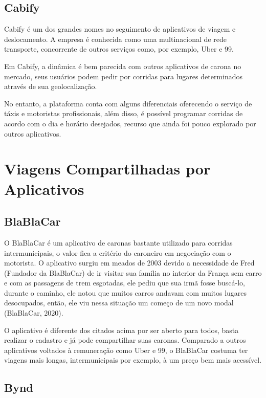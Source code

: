\subsection{Cabify}

Cabify é um dos grandes nomes no seguimento de aplicativos de viagem e deslocamento. A empresa é conhecida como uma multinacional de rede transporte, concorrente de outros serviços como, por exemplo, Uber e 99.

Em Cabify, a dinâmica é bem parecida com outros aplicativos de carona no mercado, seus usuários podem pedir por corridas para lugares determinados através de sua geolocalização.

No entanto, a plataforma conta com alguns diferenciais oferecendo o serviço de táxis e motoristas profissionais, além disso, é possível programar corridas de acordo com o dia e horário desejados, recurso que ainda foi pouco explorado por outros aplicativos. 


\section{Viagens Compartilhadas por Aplicativos}
\subsection{BlaBlaCar}

 O BlaBlaCar é um aplicativo de caronas bastante utilizado para corridas intermunicipais, o valor fica a critério do caroneiro em negociação com o motorista. O aplicativo surgiu em meados de 2003 devido a necessidade de Fred (Fundador da BlaBlaCar) de ir visitar sua família no interior da França sem carro e com as passagens de trem esgotadas, ele pediu que sua irmã fosse buscá-lo, durante o caminho, ele notou que muitos carros andavam com muitos lugares desocupados, então, ele viu nessa situação um começo de um novo modal (BlaBlaCar, 2020).
        
O aplicativo é diferente dos citados acima por ser aberto para todos, basta realizar o cadastro e já pode compartilhar suas caronas. Comparado a outros aplicativos voltados à remuneração como Uber e 99, o BlaBlaCar costuma ter viagens mais longas, intermunicipais por exemplo, à um preço bem mais acessível. %

\subsection{Bynd}

